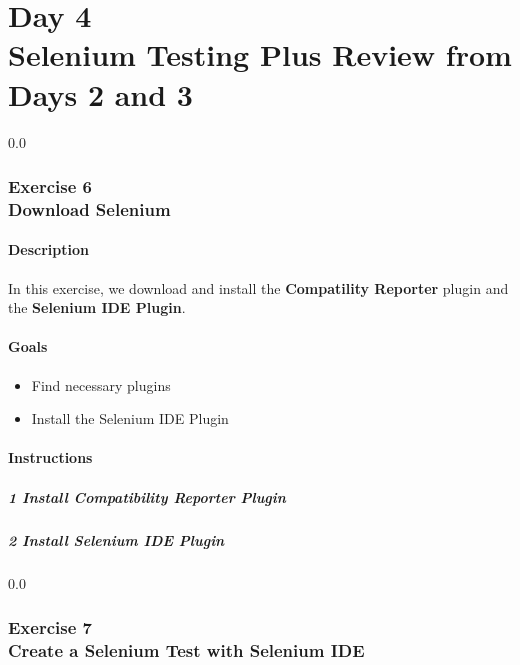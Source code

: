 \part*{Day 4\\ Selenium Testing Plus Review from Days 2 and 3}
{\setlength{\baselineskip}%
  {0.0\baselineskip}
  \section*{\flushright Exercise 6\\
 Download Selenium}
  \hrulefill \par}

\subsection*{Description}
In this exercise, we download and install the \textbf{Compatility
  Reporter} plugin and the \textbf{Selenium IDE Plugin}.

\subsection*{Goals}
\begin{itemize}
  \item Find necessary plugins
  \item Install the Selenium IDE Plugin
\end{itemize}

\subsection*{Instructions}

\subsubsection*{1 Install Compatibility Reporter Plugin}

\subsubsection*{2 Install Selenium IDE Plugin}

{\setlength{\baselineskip}%
  {0.0\baselineskip}
  \section*{\flushright Exercise 7\\
 Create a Selenium Test with Selenium IDE}
  \hrulefill \par}

